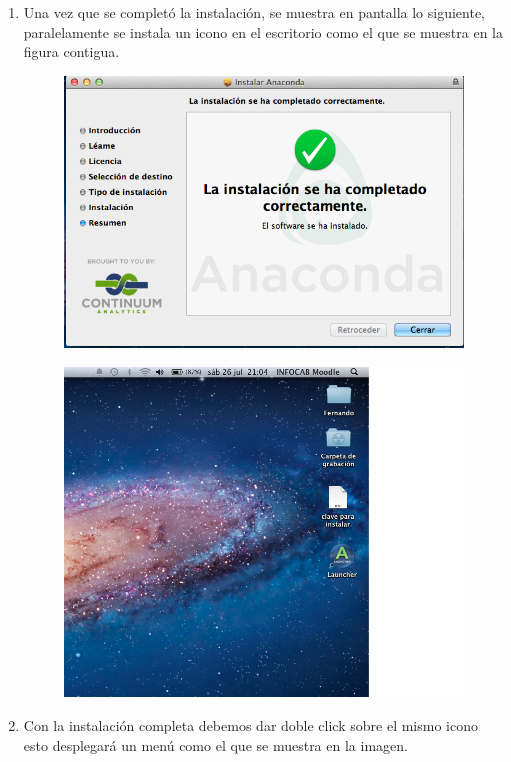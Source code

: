 \documentclass[12pt]{article}
\begin{document}
\begin{enumerate}
\begin{figure}[H]
\end{figure}
\item Una vez que se completó la instalación, se muestra en pantalla lo siguiente, paralelamente se instala un icono en el escritorio como el que se muestra en la figura  contigua.
\begin{figure}[H]
	\centering
	\includegraphics[scale=0.5]{Imagenes/instalacion4} 
\end{figure}
\begin{figure}[H]
	\centering
	\includegraphics[scale=0.4]{Imagenes/laun} 
\end{figure}  
\item Con la instalación completa debemos dar doble click sobre el mismo icono esto desplegará un menú como el que se muestra en la imagen.

\end{enumerate}
\end{document}

